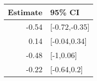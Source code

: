 \begin{tabular}{rl}
  \hline
Estimate & 95\% CI \\ 
  \hline
-0.54 & [-0.72,-0.35] \\ 
  0.14 & [-0.04,0.34] \\ 
  -0.48 & [-1,0.06] \\ 
  -0.22 & [-0.64,0.2] \\ 
   \hline
\end{tabular}

